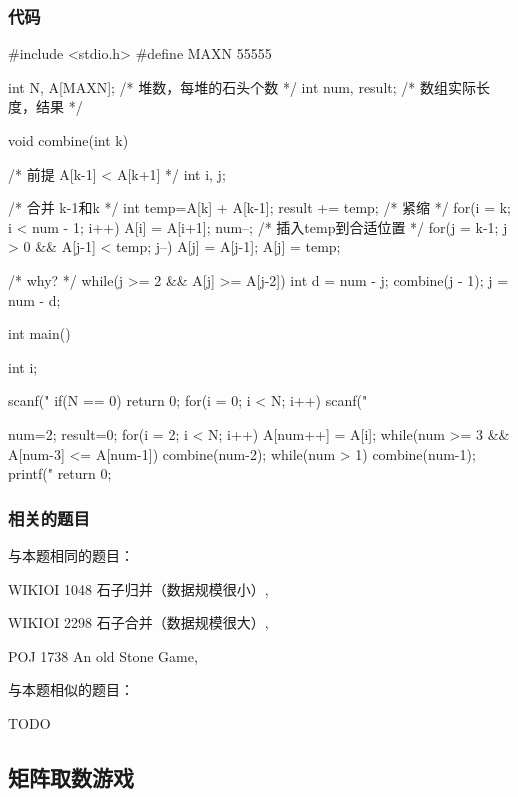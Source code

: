 \subsubsection{代码}
\begin{Codex}[label=stone_merge.c]
#include <stdio.h> 
#define MAXN 55555

int N, A[MAXN];  /* 堆数，每堆的石头个数 */
int num, result;  /* 数组实际长度，结果 */

void combine(int k) {  /* 前提 A[k-1] < A[k+1] */
    int i, j;

    /* 合并 k-1和k */
    int temp=A[k] + A[k-1];
    result += temp;
    /* 紧缩 */
    for(i = k; i < num - 1; i++) A[i] = A[i+1];
    num--;
    /* 插入temp到合适位置 */
    for(j = k-1; j > 0 && A[j-1] < temp; j--) A[j] = A[j-1];
    A[j] = temp;

    /* why? */
    while(j >= 2 && A[j] >= A[j-2]) {
        int d = num - j;
        combine(j - 1);
        j = num - d;
    }
}

int main() {
    int i;

    scanf("%
    if(N == 0)    return 0;
    for(i = 0; i < N; i++) scanf("%

    num=2;
    result=0;
    for(i = 2; i < N; i++) {
        A[num++] = A[i];
        while(num >= 3 && A[num-3] <= A[num-1]) combine(num-2);
    }
    while(num > 1) combine(num-1);
    printf("%
    return 0;
}
\end{Codex}

\subsubsection{相关的题目}
与本题相同的题目：
\begindot
\item WIKIOI 1048 石子归并（数据规模很小）, 
\item WIKIOI 2298 石子合并（数据规模很大）, 
\item POJ 1738 An old Stone Game, 
\myenddot

与本题相似的题目：
\begindot
\item TODO
\myenddot


\subsection{矩阵取数游戏}

